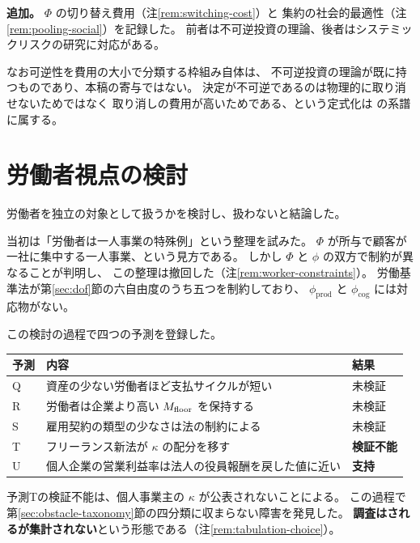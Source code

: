 \textbf{追加。} $\Phi$ の切り替え費用（注\ref{rem:switching-cost}）と
集約の社会的最適性（注\ref{rem:pooling-social}）を記録した。
前者は不可逆投資の理論、後者はシステミックリスクの研究に対応がある。

なお可逆性を費用の大小で分類する枠組み自体は、
不可逆投資の理論が既に持つものであり、本稿の寄与ではない。
決定が不可逆であるのは物理的に取り消せないためではなく
取り消しの費用が高いためである、という定式化は \cite{dixit1994} の系譜に属する。

\section{労働者視点の検討}
\label{sec:worker-predictions}

労働者を独立の対象として扱うかを検討し、扱わないと結論した。

当初は「労働者は一人事業の特殊例」という整理を試みた。
$\Phi$ が所与で顧客が一社に集中する一人事業、という見方である。
しかし $\Phi$ と $\phi$ の双方で制約が異なることが判明し、
この整理は撤回した（注\ref{rem:worker-constraints}）。
労働基準法が第\ref{sec:dof}節の六自由度のうち五つを制約しており、
$\phi_{\mathrm{prod}}$ と $\phi_{\mathrm{cog}}$ には対応物がない。

この検討の過程で四つの予測を登録した。

\begin{center}
\begin{tabularx}{\textwidth}{@{}lXl@{}}
\toprule
予測 & 内容 & 結果 \\
\midrule
Q & 資産の少ない労働者ほど支払サイクルが短い & 未検証 \\
R & 労働者は企業より高い $M_{\rm floor}$ を保持する & 未検証 \\
S & 雇用契約の類型の少なさは法の制約による & 未検証 \\
T & フリーランス新法が $\kappa$ の配分を移す & \textbf{検証不能} \\
U & 個人企業の営業利益率は法人の役員報酬を戻した値に近い & \textbf{支持} \\
\bottomrule
\end{tabularx}
\label{tab:worker-predictions}
\end{center}

予測Tの検証不能は、個人事業主の $\kappa$ が公表されないことによる。
この過程で第\ref{sec:obstacle-taxonomy}節の四分類に収まらない障害を発見した。
\textbf{調査はされるが集計されない}という形態である（注\ref{rem:tabulation-choice}）。

